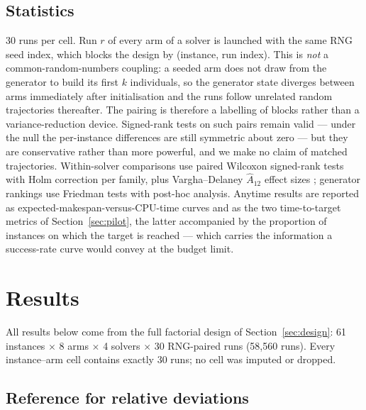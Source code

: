 \documentclass[review]{elsarticle}
\begin{document}
\subsection{Statistics}
30 runs per cell. Run $r$ of every arm of a solver is launched with the
same RNG seed index, which blocks the design by (instance, run index).
This is \emph{not} a common-random-numbers coupling: a seeded arm does not
draw from the generator to build its first $k$ individuals, so the
generator state diverges between arms immediately after initialisation and
the runs follow unrelated random trajectories thereafter. The pairing is
therefore a labelling of blocks rather than a variance-reduction device.
Signed-rank tests on such pairs remain valid --- under the null the
per-instance differences are still symmetric about zero --- but they are
conservative rather than more powerful, and we make no claim of matched
trajectories. Within-solver comparisons use
paired Wilcoxon signed-rank tests with Holm correction per family, plus
Vargha--Delaney $\hat{A}_{12}$ effect sizes \cite{Vargha2000,Derrac2011};
generator rankings use Friedman tests with post-hoc analysis. Anytime
results are reported as expected-makespan-versus-CPU-time curves and as the
two time-to-target metrics of Section~\ref{sec:pilot}, the latter
accompanied by the proportion of instances on which the target is reached
--- which carries the information a success-rate curve would convey at the
budget limit.

\section{Results}\label{sec:results}

All results below come from the full factorial design of
Section~\ref{sec:design}: 61 instances $\times$ 8 arms $\times$ 4 solvers
$\times$ 30 RNG-paired runs (58{,}560 runs). Every instance--arm cell
contains exactly 30 runs; no cell was imputed or dropped.

\subsection{Reference for relative deviations}\label{sec:rpd-ref}
\end{document}
